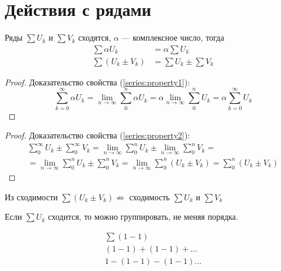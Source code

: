 \section{Действия с рядами}

\begin{theorem}
  Ряды $\sum U_k$ и $\sum V_k$ сходятся, $\alpha$ --- комплексное число, тогда
  \begin{align}
    \label{series:property1}
    \sum\alpha U_k &= \alpha\sum U_k \\
    \label{series:property2}
    \sum (U_k \pm V_k) &= \sum U_k \pm \sum V_k
  \end{align}
\end{theorem}
\begin{proof}
  Доказательство свойства (\eqref{series:property1}):
  $$\sum\limits_{k=0}^\infty \alpha U_k = \lim\limits_{n \to \infty}
  \sum\limits_0^n \alpha U_k = \alpha \lim\limits_{n \to \infty} \sum\limits_0^n U_k
  = \alpha \sum\limits_{k = 0}^\infty U_k$$
\end{proof}
\begin{proof}
  Доказательство свойства (\eqref{series:property2}):
  \begin{gather*}
      \sum\limits_0^\infty U_k \pm \sum\limits_{0}^{\infty} V_k
      = \lim\limits_{n \to \infty} \sum\limits_{0}^{n} U_k
      \pm \lim\limits_{n \to \infty} \sum\limits_{0}^{n} V_k = \\
      = \lim\limits_{n \to \infty} \sum\limits_{0}^{n} U_k
      \pm \sum\limits_{0}^{n} V_k
      = \lim\limits_{n \to \infty} \sum\limits_{0}^{n} (U_k \pm V_k)
      = \sum\limits_{0}^{n} (U_k \pm V_k)
  \end{gather*}
\end{proof}

\begin{remark}
  Из сходимости $\sum (U_k \pm V_k) \not \Rightarrow$ сходимость
  $\sum U_k$ и $\sum V_k$
\end{remark}
\begin{remark}
  Если $\sum U_k$ сходится, то можно группировать, не меняя порядка.
\end{remark}
\begin{example}
  \begin{gather*}
    \sum (1 - 1) \\
    (1 - 1) + (1 - 1) + \dots \\
    1 - (1 - 1) - (1 - 1) \dots
  \end{gather*}
\end{example}
\begin{comment}
  Нельзя раскрывать скобки и переставлять члены.
\end{comment}
